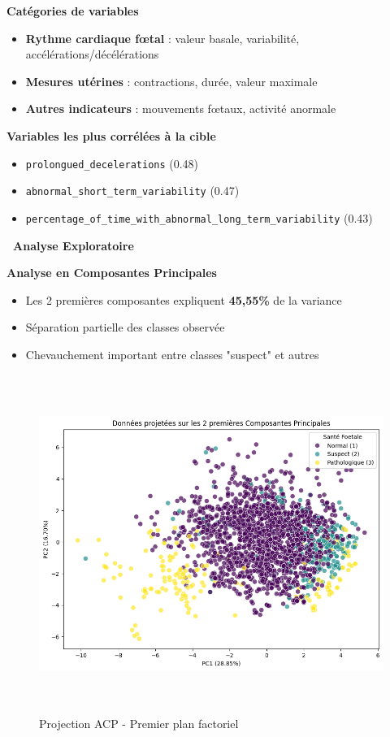 \documentclass[a0,landscape]{a0poster}
\newcommand{\bigsection}[1]{
  \vspace{0.5cm}
  \begin{tcolorbox}[
    colback=primaryblue,
    coltext=white,
    arc=2mm,
    boxrule=0pt,
    left=10pt,
    right=10pt,
    top=5pt,
    bottom=5pt
  ]
    {\Large\bfseries #1\par}
  \end{tcolorbox}
  \vspace{0.3cm}
}
\newcommand{\infoitem}{\item[\textcolor{primaryblue}{\faInfoCircle}]}
\begin{document}
\begin{multicols}{3}
\textbf{\color{primaryblue} Catégories de variables}
\begin{itemize}
  \infoitem \textbf{Rythme cardiaque fœtal} : valeur basale, variabilité, accélérations/décélérations
  \infoitem \textbf{Mesures utérines} : contractions, durée, valeur maximale
  \infoitem \textbf{Autres indicateurs} : mouvements fœtaux, activité anormale
\end{itemize}

\vspace{0.5cm}


\textbf{\color{primaryblue} Variables les plus corrélées à la cible}
\begin{itemize}
  \item \texttt{prolongued\_decelerations} (0.48)
  \item \texttt{abnormal\_short\_term\_variability} (0.47)  
  \item \texttt{percentage\_of\_time\_with\_abnormal\_long\_term\_variability} (0.43)
\end{itemize}

\vspace{1em}
\bigsection{\faSearch\ Analyse Exploratoire}
\vspace{1em}
\textbf{\color{primaryblue} Analyse en Composantes Principales}
\begin{itemize}
  \infoitem Les 2 premières composantes expliquent \textbf{45,55\%} de la variance
  \infoitem Séparation partielle des classes observée
  \infoitem Chevauchement important entre classes "suspect" et autres
\end{itemize}

\vspace{0.5cm}

\begin{figure}[H]
  \centering
  \includegraphics[width=0.9\linewidth,height=11cm,keepaspectratio]{acp_projection.png}
  \caption{Projection ACP - Premier plan factoriel}
  \label{fig:acp}
\end{figure}


\end{multicols}
\end{document}
